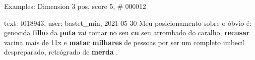 \begin{frame}{Examples: Dimension 3 pos, score 5, \# 000012}
\footnotesize
\begin{exampleblock}{text: t018943, user: bastet\_min, 2021-05-30}
Meu posicionamento sobre o óbvio é: genocida \textbf{filho} da \textbf{puta} 
vai tomar no seu \textbf{cu} seu arrombado do caralho, \textbf{recusar} vacina 
mais de 11x e \textbf{matar} \textbf{milhares} de pessoas por ser um completo 
imbecil despreparado, retrógrado de \textbf{merda} .  
\end{exampleblock}
\end{frame}
